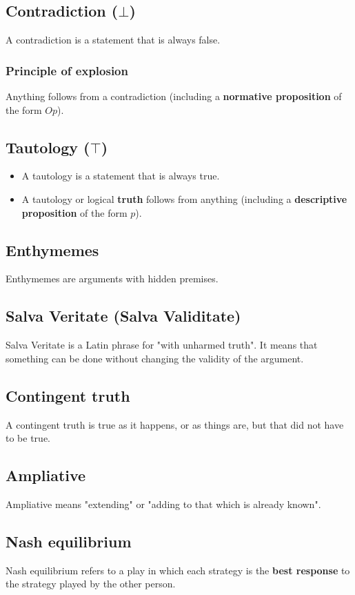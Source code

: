\documentclass[11pt]{article}
\begin{document}
\subsection{Contradiction (\(\bot\))}
\label{sec:orgf07e8c2}
A contradiction is a statement that is always false.
\subsubsection{Principle of explosion}
\label{sec:org756e668}
Anything follows from a contradiction (including a \textbf{normative proposition} of the form \(Op\)).
\subsection{Tautology (\(\top\))}
\label{sec:org2560c66}
\begin{itemize}
\item A tautology is a statement that is always true.
\item A tautology or logical \textbf{truth} follows from anything (including a \textbf{descriptive proposition} of the form \(p\)).
\end{itemize}
\subsection{Enthymemes}
\label{sec:orgb5f12b7}
Enthymemes are arguments with hidden premises.
\subsection{Salva Veritate (Salva Validitate)}
\label{sec:orgda899ea}
Salva Veritate is a Latin phrase for "with unharmed truth". It means that something can be done without changing the validity of the argument.
\subsection{Contingent truth}
\label{sec:org3d8042a}
A contingent truth is true as it happens, or as things are, but that did not have to be true.
\subsection{Ampliative}
\label{sec:org8ad3640}
Ampliative means "extending" or "adding to that which is already known".

 \newpage
\subsection{Nash equilibrium}
\label{sec:org2e376d9}
Nash equilibrium refers to a play in which each strategy is the \textbf{best response} to the strategy played by the other person.
\end{document}
